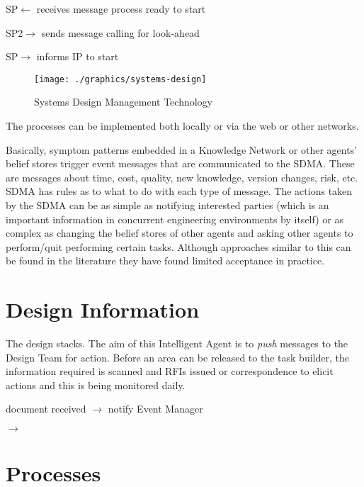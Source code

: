 SP$\leftarrow$ receives message process ready to start

SP2$\rightarrow$ sends message calling for look-ahead

SP$\rightarrow$ informs IP to start


\begin{figure}
\centering
\texttt{[image: ./graphics/systems-design]}
\caption{Systems Design Management Technology}
\end{figure}


The processes can be implemented both locally or via the web or other networks.


Basically, symptom patterns embedded in a Knowledge Network or other agents' belief stores
trigger event messages that are communicated to the SDMA. These are messages about time,
cost, quality, new knowledge, version changes, risk, etc. SDMA has rules as to what to do with
each type of message. The actions taken by the SDMA can be as simple as notifying interested
parties (which is an important information in concurrent engineering environments by itself) or
as complex as changing the belief stores of other agents and asking other agents to perform/quit
performing certain tasks. Although approaches similar to this can be found in the literature they have found limited acceptance in practice.

\section*{Design Information}

The design stacks. The aim of this Intelligent Agent is to \textit{push} messages to the Design Team for action. Before an area can be released to the task builder, the information required is scanned and RFIs issued or correspondence to elicit actions and this is being monitored daily.

document received $\rightarrow$ notify Event Manager



 $\rightarrow$ 



\section*{Processes}

